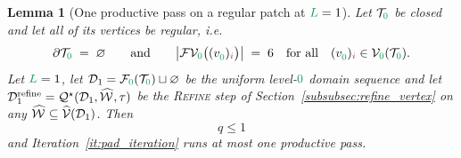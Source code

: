\documentclass[a4paper, 12pt]{article}
\makeatletter
\newcommand{\quadriV}{\mathcal{Q}^{\star}}                       %
\newcommand{\quadriVup}[1]{\quadriV_{\rightarrow #1}}            %
\newcommand{\targetlevel}{\tau}                                 %
\newcommand{\green}{\color{ForestGreen}}
\newcommand{\brickred}{\color{BrickRed}}
\newcommand{\T}{\mathcal{T}}
\newcommand{\V}{\mathcal{V}}
\newcommand{\F}{\mathcal{F}}
\newcommand{\vertex}[2]{\freeQ{v}{}{#1}{#2}}
\newcommand{\vertexClasses}{\widehat{\V}}
\DeclareRobustCommand{\markedVertexClasses}[1][]{\widehat{\mathcal{W}}\ifx\@empty#1\@empty\else^{#1}\fi}
\newcommand{\FVl}[1]{\F\V_{#1}}
\newcommand{\coarseIdxone}{{\brickred i}}
\renewcommand{\L}{{\green L}}
\newcommand{\lzero}{{\green 0}}
\newcommand{\freeQ}[4]{ ( {#1}^{#2}_{#3} )_{#4}}
\newtheorem{lemma}[theorem]{Lemma}
\theoremstyle{definition}
\theoremstyle{plain}
\numberwithin{equation}{section}
\newcommand{\tobecut}[1]{{\color{red} #1}}     %
\DeclareRobustCommand{\domseq}[1][]{\mathcal{D}\ifx\@empty#1\@empty\else_{#1}\fi}
\makeatother
\begin{document}
\begin{lemma}[One productive pass on a regular patch at $\L = 1$]
    \label{lemma:stars_only_bound}
    Let $\T_\lzero$ be closed and let all of its vertices be regular, i.e.
    \begin{equation}
        \label{eq:regular_patch}
        \partial \T_\lzero \; = \; \varnothing
        \qquad \text{and} \qquad
        \big\vert \FVl{\lzero} \big( \vertex{\lzero}{\coarseIdxone} \big) \big\vert \; = \; 6
        \quad \text{for all} \quad
        \vertex{\lzero}{\coarseIdxone} \in \V_\lzero(\T_\lzero).
    \end{equation}
        Let $\L = 1$, let $\domseq[1] = \F_\lzero(\T_\lzero) \sqcup \varnothing$ be the uniform level-$\lzero$ domain sequence and let $\domseq[1]^{\mathrm{refine}} = \quadriV(\domseq[1], \markedVertexClasses, \targetlevel)$ be the \textsc{Refine} step of Section~\ref{subsubsec:refine_vertex} on any $\markedVertexClasses \subseteq \vertexClasses(\domseq[1])$. Then
    \begin{equation}
        q \leq 1
    \end{equation}
    and Iteration~\ref{it:pad_iteration} runs at most one productive pass.
\end{lemma}
\end{document}
